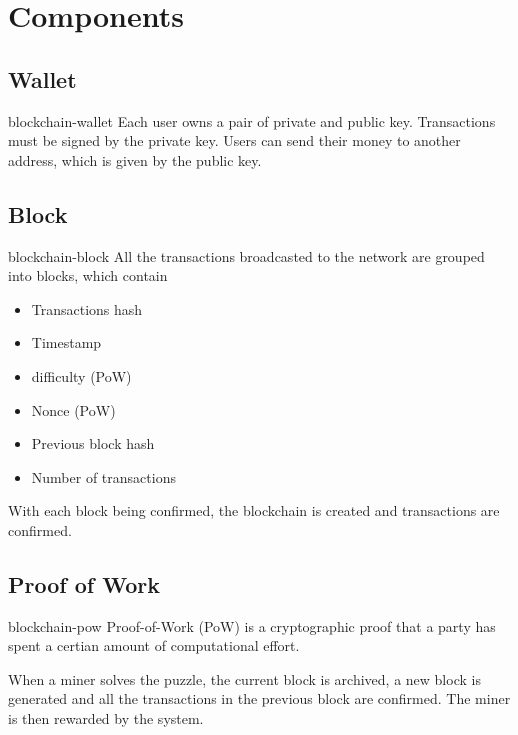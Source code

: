 \documentclass[preview]{standalone}
\begin{document}
\genpage

\section{Components}

\subsection{Wallet}

\begin{snippet}{blockchain-wallet}
Each user owns a pair of private and public key.
Transactions must be signed by the private key. Users
can send their money to another address, which is given by the public key.
\end{snippet}

\subsection{Block}

\begin{snippet}{blockchain-block}
All the transactions broadcasted to the network are grouped into blocks, which contain

\begin{itemize}
    \item Transactions hash
    \item Timestamp
    \item difficulty (PoW)
    \item Nonce (PoW)
    \item Previous block hash
    \item Number of transactions
\end{itemize}

With each block being confirmed, the blockchain is created
and transactions are confirmed.
\end{snippet}

\subsection{Proof of Work}

\begin{snippet}{blockchain-pow}
Proof-of-Work (PoW) is a cryptographic proof that a party has spent
a certian amount of computational effort.

When a miner solves the puzzle, the current block is archived, a new
block is generated and all the transactions in the previous block are confirmed.
The miner is then rewarded by the system.
\end{snippet}
\end{document}
